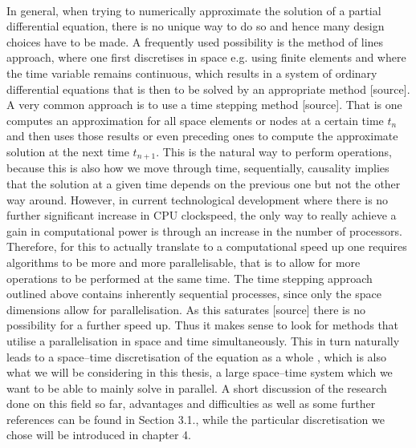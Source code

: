 \documentclass[../draft_1.tex]{subfiles}
\begin{document}
\smallskip
\\
In general, when trying to numerically approximate the solution of a partial differential equation, there is no unique way to do so and hence many design choices have to be made. A frequently used possibility is the method of lines approach, where one first discretises in space  e.g. using finite elements and where the time variable remains continuous, which results in a system of ordinary differential equations that is then to be solved by an appropriate method [source]. A very common approach is to use a time stepping method [source]. That is one computes an approximation for all space elements or nodes at a certain time $t_n$ and then uses those results or even preceding ones to compute the approximate solution at the next time $t_{n+1}$. This is the natural way to perform operations, because this is also how we move through time, sequentially, causality implies that the solution at a given time depends on the previous one but not the other way around. 
However, in current technological development where there is no further significant increase in CPU clockspeed, the only way to really achieve a gain in computational power is through an increase in the number of processors. Therefore, for this to actually translate to a computational speed up one requires algorithms to be more and more parallelisable, that is to allow for more operations to be performed at the same time. The time stepping approach outlined above contains inherently sequential processes, since only the space dimensions allow for parallelisation. As this saturates [source] there is no possibility for a further speed up. Thus it makes sense to look for methods that utilise a parallelisation in space and time simultaneously. This in turn naturally leads to a space--time discretisation of the equation as a whole \cite{gander201550}, which is also what we will be considering in this thesis, a large space--time system which we want to be able to mainly solve in parallel. A short discussion of the research done on this field so far, advantages and difficulties as well as some further references can be found in Section 3.1., while the particular discretisation we chose will be introduced in chapter 4.
\bigskip
\\
\end{document}
